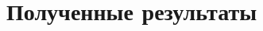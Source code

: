\documentclass[document.tex]{subfiles}
\begin{document}
\section{Полученные результаты}
\end{document}
